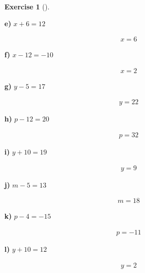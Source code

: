 \documentclass[
  letterpaper,
  DIV=11,
  numbers=noendperiod]{scrreprt}
\theoremstyle{definition}
\newtheorem{exercise}{Exercise}[chapter]
\theoremstyle{remark}
\begin{document}
\begin{exercise}[]
\begin{tcolorbox}
\textbf{e)} \(\displaystyle x + 6 = 12\)

\begin{align*}
x = 6
\end{align*}

\textbf{f)} \(\displaystyle x - 12 = -10\)

\begin{align*}
x = 2
\end{align*}

\textbf{g)} \(\displaystyle y - 5 = 17\)

\begin{align*}
y = 22
\end{align*}

\textbf{h)} \(\displaystyle p - 12 = 20\)

\begin{align*}
p = 32
\end{align*}

\textbf{i)} \(\displaystyle y + 10 = 19\)

\begin{align*}
y = 9
\end{align*}

\textbf{j)} \(\displaystyle m - 5 = 13\)

\begin{align*}
m = 18
\end{align*}

\textbf{k)} \(\displaystyle p - 4 = -15\)

\begin{align*}
p = -11
\end{align*}

\textbf{l)} \(\displaystyle y + 10 = 12\)

\begin{align*}
y = 2
\end{align*}

\end{tcolorbox}

\end{exercise}
\end{document}
